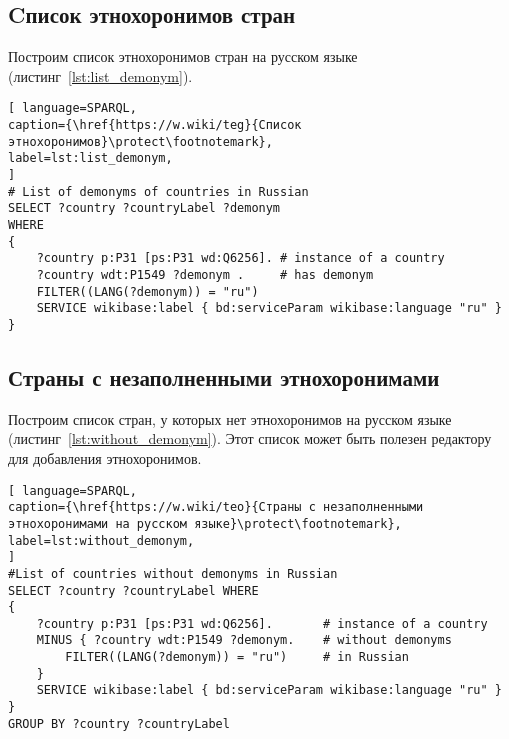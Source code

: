 \subsection{Cписок этнохоронимов стран}


Построим список этнохоронимов стран на русском языке (листинг~\ref{lst:list_demonym}).

\begin{lstlisting}[ language=SPARQL, 
caption={\href{https://w.wiki/teg}{Cписок этнохоронимов}\protect\footnotemark},
label=lst:list_demonym, 
]
# List of demonyms of countries in Russian
SELECT ?country ?countryLabel ?demonym
WHERE
{
	?country p:P31 [ps:P31 wd:Q6256]. # instance of a country
	?country wdt:P1549 ?demonym .     # has demonym
	FILTER((LANG(?demonym)) = "ru")
	SERVICE wikibase:label { bd:serviceParam wikibase:language "ru" }
}
\end{lstlisting}





\newpage
\subsection{Страны с незаполненными этнохоронимами}

Построим список стран, у которых нет этнохоронимов на русском языке (листинг~\ref{lst:without_demonym}). 
Этот список может быть полезен редактору для добавления этнохоронимов. 


\begin{lstlisting}[ language=SPARQL, 
caption={\href{https://w.wiki/teo}{Страны с незаполненными этнохоронимами на русском языке}\protect\footnotemark},
label=lst:without_demonym, 
]
#List of countries without demonyms in Russian
SELECT ?country ?countryLabel WHERE
{
	?country p:P31 [ps:P31 wd:Q6256].       # instance of a country
	MINUS { ?country wdt:P1549 ?demonym.    # without demonyms
        FILTER((LANG(?demonym)) = "ru")     # in Russian
	}
	SERVICE wikibase:label { bd:serviceParam wikibase:language "ru" }
}
GROUP BY ?country ?countryLabel
\end{lstlisting}

